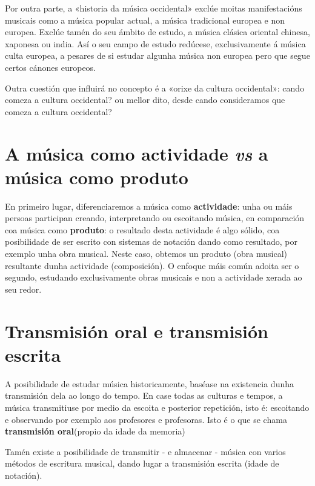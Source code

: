 \documentclass[a4paper, twoside]{templates/ociamthesis}
\begin{document}
Por outra parte, a «historia da música occidental» exclúe moitas manifestacións musicais como a música popular actual, a música tradicional europea e non europea. Exclúe tamén do seu ámbito de estudo, a música clásica oriental chinesa, xaponesa ou india. Así o seu campo de estudo redúcese, exclusivamente á música culta europea, a pesares de si estudar algunha música non europea pero que segue certos cánones europeos.

Outra cuestión que influirá no concepto é a «orixe da cultura occidental»: cando comeza a cultura occidental? ou mellor dito, desde cando consideramos que comeza a cultura occidental?

\hypertarget{a-muxfasica-como-actividade-vs-a-muxfasica-como-produto}{%
\section{\texorpdfstring{A música como actividade \emph{vs} a música como produto}{A música como actividade vs a música como produto}}\label{a-muxfasica-como-actividade-vs-a-muxfasica-como-produto}}

En primeiro lugar, diferenciaremos a música como \textbf{actividade}: unha ou máis persoas participan creando, interpretando ou escoitando música, en comparación coa música como \textbf{produto}: o resultado desta actividade é algo sólido, coa posibilidade de ser escrito con sistemas de notación dando como resultado, por exemplo unha obra musical. Neste caso, obtemos un produto (obra musical) resultante dunha actividade (composición).
O enfoque máis común adoita ser o segundo, estudando exclusivamente obras musicais e non a actividade xerada ao seu redor.

\hypertarget{transmisiuxf3n-oral-e-transmisiuxf3n-escrita}{%
\section{Transmisión oral e transmisión escrita}\label{transmisiuxf3n-oral-e-transmisiuxf3n-escrita}}

A posibilidade de estudar música historicamente, baséase na existencia dunha transmisión dela ao longo do tempo.
En case todas as culturas e tempos, a música transmitiuse por medio da escoita e posterior repetición, isto é: escoitando e observando por exemplo aos profesores e profesoras. Isto é o que se chama \textbf{transmisión oral}(propio da idade da memoria)

Tamén existe a posibilidade de transmitir - e almacenar - música con varios métodos de escritura musical, dando lugar a transmisión escrita (idade de notación).
\end{document}
